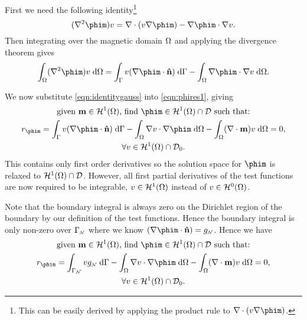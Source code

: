 First we need the following identity\footnote{This can be easily derived by applying the product rule to $\nabla \cdot (v \nabla \phim)$.}
\begin{equation}
  (\nabla^2 \phim) v =
  \nabla \cdot (v \nabla \phim)
  - \nabla \phim \cdot \nabla v.
  \label{eq:20}
\end{equation}
Then integrating over the magnetic domain $\Omega$ and applying the divergence theorem gives
\begin{equation}
  \int_\magd (\nabla^2 \phim) v \d \magd =
  \int_{\boundd} v (\nabla \phim \cdot \nv) \d \boundd
  - \int_\magd \nabla \phim \cdot \nabla v \d \magd.
  \label{eqn:identitygauss}
\end{equation}

We now substitute \eqref{eqn:identitygauss} into \eqref{eqn:phires1}, giving
\begin{gather}
   \text{given $\mv \in \sob^1(\magd)$, find $\phim \in \sob^1(\magd) \cap \Dfs$ such that:} \notag \\
  r_{\phim} = \int_{\boundd} v (\nabla \phim \cdot \nv) \d \boundd
  - \int_\magd \nabla v \cdot \nabla \phim \d \magd
  - \int_\magd (\nabla \cdot \mv) v \d \magd = 0
  , \notag \\
  \forall v \in \sob^1(\magd) \cap \Dfs_0. \notag
\end{gather}
This contains only first order derivatives so the solution space for $\phim$ is relaxed to $\mathcal{H}^1(\Omega) \cap \mathcal{D}$. However, all first partial derivatives of the test functions are now required to be integrable, \ie $v \in \mathcal{H}^1(\Omega)$ instead of $v \in \mathcal{H}^0(\Omega)$.

Note that the boundary integral is always zero on the Dirichlet region of the boundary by our definition of the test functions. Hence the boundary integral is only non-zero over ${\Gamma}_{{\scriptscriptstyle{\mathcal{N}}}}$ where we know $(\nabla \phim \cdot \nv) = g_{\Neu}$. Hence we have
\begin{gather}
   \text{given $\mv \in \sob^1(\magd)$, find $\phim \in \sob^1(\magd) \cap \Dfs$ such that:} \notag \\
  r_{\phim} = \int_{\boundd_\Neu} v g_\Neu \d \boundd
  - \int_\magd \nabla v \cdot \nabla \phim \d \magd
  - \int_\magd (\nabla \cdot \mv) v \d \magd = 0
  , \label{res:contphi} \\
  \forall v \in \sob^1(\magd) \cap \Dfs_0. \notag
\end{gather}


